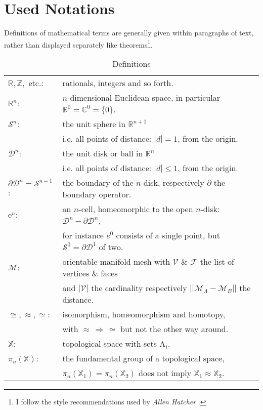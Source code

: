 \section*{Used Notations}
\label{notations}

Definitions of mathematical terms are generally given within paragraphs of text, rather than displayed separately like theorems\footnote{ I follow the style recommendations used by \textit{Allen Hatcher} \citep[cf.][]{Hatcher2002}.}.
\begin{table}[htpb] \medskip
\setlength{\tabcolsep}{5pt}
\renewcommand{\arraystretch}{1.25}
   \label{tab:notations} \caption{Definitions}
\begin{tabular}{ l l }
	$\mathbb{R, Z,}$ etc.: & rationals, integers and so forth.\\
	$\mathbb{R}^{n}$: & $n$-dimensional Euclidean space, in particular $\mathbb{R}^{0} = \mathbb{C}^{0} = \{0\}$.\\
	$\mathcal{S}^{n}$: & the unit sphere in $\mathbb{R}^{n+1}$\\ & i.e. all points of distance: $|d|=1$, from the origin.\\
	$\mathcal{D}^{n}$: & the unit disk or ball in $\mathbb{R}^{n}$\\ & i.e. all points of distance: $|d| \leq 1$, from the origin.\\
	$\partial \mathcal{D}^{n} = \mathcal{S}^{n-1}$: & the boundary of the $n$-disk, respectively $\partial$ the boundary operator.\\
	$\mathrm{e}^{n}$: & an $n$-cell, homeomorphic to the open $n$-disk: $\mathcal{D}^{n} - \partial \mathcal{D}^{n}$,\\ & for instance $e^{0}$ consists of a single point, but $\mathcal{S}^{0} = \partial \mathcal{D}^{1}$ of two.\\
	$\mathcal{M}$: & orientable manifold mesh with $\mathcal{V}$ \& $\mathcal{F}$ the list of vertices \& faces \\ & and $|\mathcal{V}|$ the cardinality respectively $||\mathcal{M}_{A} - \mathcal{M}_{B}||$ the distance.\\
	$\cong, \approx, \simeq$: & isomorphism, homeomorphism and homotopy, \\ & with $\approx \, \Rightarrow \, \simeq$ but not the other way around.\\
	$\mathbb{X}$: & topological space with sets $\mathrm{A}_{i}$.\\
	$\pi_{n}(\mathbb{X})$: & the fundamental group of a topological space,\\ & $\pi_{n}(\mathbb{X}_{1}) = \pi_{n}(\mathbb{X}_{2})$ does not imply $\mathbb{X}_{1} \approx \mathbb{X}_{2}$.\\

\end{tabular}
\end{table}
